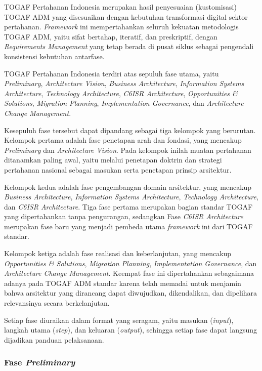 TOGAF Pertahanan Indonesia merupakan hasil penyesuaian (kustomisasi) TOGAF ADM yang disesuaikan dengan kebutuhan transformasi digital sektor pertahanan. \textit{Framework} ini mempertahankan seluruh kekuatan metodologis TOGAF ADM, yaitu sifat bertahap, iteratif, dan preskriptif, dengan \textit{Requirements Management} yang tetap berada di pusat siklus sebagai pengendali konsistensi kebutuhan antarfase.

TOGAF Pertahanan Indonesia terdiri atas sepuluh fase utama, yaitu \textit{Preliminary}, \textit{Architecture Vision}, \textit{Business Architecture}, \textit{Information Systems Architecture}, \textit{Technology Architecture}, \textit{C6ISR Architecture}, \textit{Opportunities \& Solutions}, \textit{Migration Planning}, \textit{Implementation Governance}, dan \textit{Architecture Change Management}.

Kesepuluh fase tersebut dapat dipandang sebagai tiga kelompok yang berurutan. Kelompok pertama adalah fase penetapan arah dan fondasi, yang mencakup \textit{Preliminary} dan \textit{Architecture Vision}. Pada kelompok inilah muatan pertahanan ditanamkan paling awal, yaitu melalui penetapan doktrin dan strategi pertahanan nasional sebagai masukan serta penetapan prinsip arsitektur.

Kelompok kedua adalah fase pengembangan domain arsitektur, yang mencakup \textit{Business Architecture}, \textit{Information Systems Architecture}, \textit{Technology Architecture}, dan \textit{C6ISR Architecture}. Tiga fase pertama merupakan bagian standar TOGAF yang dipertahankan tanpa pengurangan, sedangkan Fase \textit{C6ISR Architecture} merupakan fase baru yang menjadi pembeda utama \textit{framework} ini dari TOGAF standar.

Kelompok ketiga adalah fase realisasi dan keberlanjutan, yang mencakup \textit{Opportunities \& Solutions}, \textit{Migration Planning}, \textit{Implementation Governance}, dan \textit{Architecture Change Management}. Keempat fase ini dipertahankan sebagaimana adanya pada TOGAF ADM standar karena telah memadai untuk menjamin bahwa arsitektur yang dirancang dapat diwujudkan, dikendalikan, dan dipelihara relevansinya secara berkelanjutan.

Setiap fase diuraikan dalam format yang seragam, yaitu masukan (\textit{input}), langkah utama (\textit{step}), dan keluaran (\textit{output}), sehingga setiap fase dapat langsung dijadikan panduan pelaksanaan.

\subsubsection{Fase \textit{Preliminary}}

